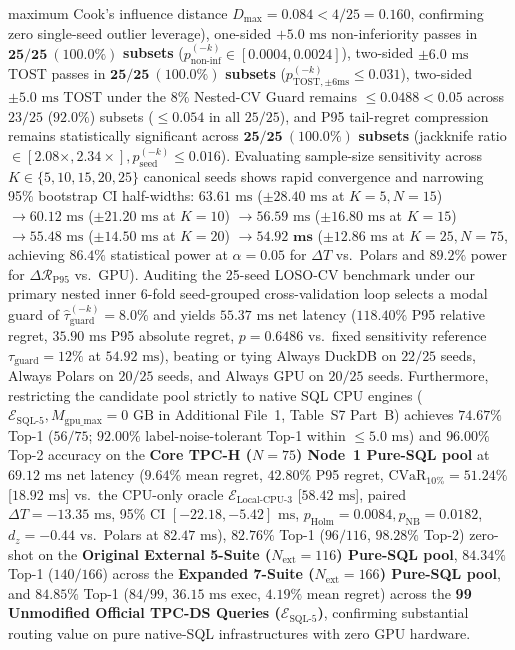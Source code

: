 \documentclass[10pt,a4paper]{article}
\begin{document}
maximum Cook's influence distance $D_{\max} = 0.084 < 4/25 = 0.160$, confirming zero single-seed outlier leverage), one-sided $+5.0\text{ ms}$ non-inferiority passes in $\mathbf{25/25\ (100.0\%)}$ \textbf{subsets} ($p_{\text{non-inf}}^{(-k)} \in [0.0004, 0.0024]$), two-sided $\pm 6.0\text{ ms}$ TOST passes in $\mathbf{25/25\ (100.0\%)}$ \textbf{subsets} ($p_{\text{TOST},\pm 6\text{ms}}^{(-k)} \le 0.031$), two-sided $\pm 5.0\text{ ms}$ TOST under the $8\%$ Nested-CV Guard remains $\le 0.0488 < 0.05$ across $23/25$ ($92.0\%$) subsets ($\le 0.054$ in all $25/25$), and P95 tail-regret compression remains statistically significant across $\mathbf{25/25\ (100.0\%)}$ \textbf{subsets} (jackknife ratio $\in [2.08\times, 2.34\times], p_{\text{seed}}^{(-k)} \le 0.016$). Evaluating sample-size sensitivity across $K \in \{5, 10, 15, 20, 25\}$ canonical seeds shows rapid convergence and narrowing 95\% bootstrap CI half-widths: $63.61\text{ ms}$ ($\pm 28.40\text{ ms}$ at $K=5, N=15$) $\rightarrow 60.12\text{ ms}$ ($\pm 21.20\text{ ms}$ at $K=10$) $\rightarrow 56.59\text{ ms}$ ($\pm 16.80\text{ ms}$ at $K=15$) $\rightarrow 55.48\text{ ms}$ ($\pm 14.50\text{ ms}$ at $K=20$) $\rightarrow \mathbf{54.92\text{ ms}}$ ($\pm 12.86\text{ ms}$ at $K=25, N=75$, achieving $86.4\%$ statistical power at $\alpha=0.05$ for $\Delta T$ vs.\ Polars and $89.2\%$ power for $\Delta\mathcal{R}_{\text{P95}}$ vs.\ GPU). Auditing the 25-seed LOSO-CV benchmark under our primary nested inner 6-fold seed-grouped cross-validation loop selects a modal guard of $\hat{\tau}_{\text{guard}}^{(-k)}=8.0\%$ and yields $55.37\text{ ms}$ net latency ($118.40\%$ P95 relative regret, $35.90\text{ ms}$ P95 absolute regret, $p=0.6486$ vs.\ fixed sensitivity reference $\tau_{\text{guard}}=12\%$ at $54.92\text{ ms}$), beating or tying Always DuckDB on $22/25$ seeds, Always Polars on $20/25$ seeds, and Always GPU on $20/25$ seeds. Furthermore, restricting the candidate pool strictly to native SQL CPU engines ($\mathcal{E}_{\text{SQL-5}}, M_{\text{gpu\_max}}=0\text{ GB}$ in Additional File~1, Table~S7 Part~B) achieves $\mathbf{74.67\%}$ Top-1 ($56/75$; $\mathbf{92.00\%}$ label-noise-tolerant Top-1 within $\le 5.0\text{ ms}$) and $\mathbf{96.00\%}$ Top-2 accuracy on the \textbf{Core TPC-H ($N=75$) Node~1 Pure-SQL pool} at $69.12\text{ ms}$ net latency ($9.64\%$ mean regret, $42.80\%$ P95 regret, $\text{CVaR}_{10\%}=51.24\%$ [$18.92\text{ ms}$] vs.\ the CPU-only oracle $\mathcal{E}_{\text{Local-CPU-3}}$ [$58.42\text{ ms}$], paired $\Delta T = -13.35\text{ ms}$, 95\% CI $[-22.18, -5.42]\text{ ms}$, $p_{\text{Holm}}=0.0084, p_{\text{NB}}=0.0182$, $d_z = -0.44$ vs.\ Polars at $82.47\text{ ms}$), $\mathbf{82.76\%}$ Top-1 ($96/116$, $\mathbf{98.28\%}$ Top-2) zero-shot on the \textbf{Original External 5-Suite ($N_{\text{ext}}=116$) Pure-SQL pool}, $\mathbf{84.34\%}$ Top-1 ($140/166$) across the \textbf{Expanded 7-Suite ($N_{\text{ext}}=166$) Pure-SQL pool}, and $\mathbf{84.85\%}$ Top-1 ($84/99$, $36.15\text{ ms}$ exec, $4.19\%$ mean regret) across the \textbf{99 Unmodified Official TPC-DS Queries ($\mathcal{E}_{\text{SQL-5}}$)}, confirming substantial routing value on pure native-SQL infrastructures with zero GPU hardware.
\end{document}
